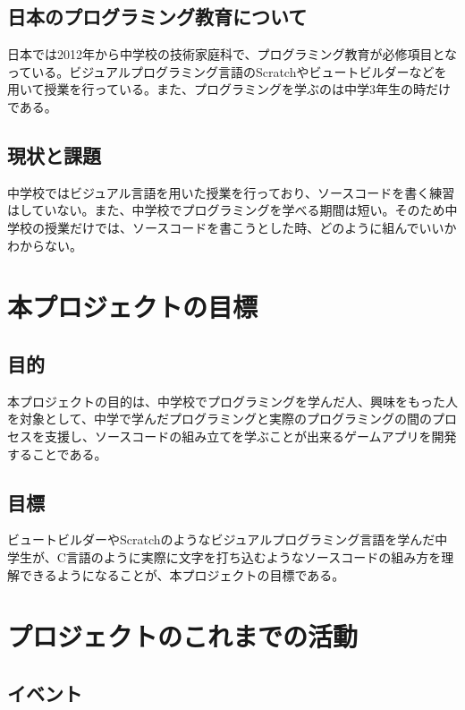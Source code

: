 \documentclass[openany,11pt,papersize]{jsbook}
\begin{document}
\section{日本のプログラミング教育について}
日本では2012年から中学校の技術家庭科で、プログラミング教育が必修項目となっている。ビジュアルプログラミング言語のScratchやビュートビルダーなどを用いて授業を行っている。また、プログラミングを学ぶのは中学3年生の時だけである。


\section{現状と課題}
中学校ではビジュアル言語を用いた授業を行っており、ソースコードを書く練習はしていない。また、中学校でプログラミングを学べる期間は短い。そのため中学校の授業だけでは、ソースコードを書こうとした時、どのように組んでいいかわからない。

\chapter{本プロジェクトの目標}

\section{目的}\label{sec:mokuteki}
本プロジェクトの目的は、中学校でプログラミングを学んだ人、興味をもった人を対象として、中学で学んだプログラミングと実際のプログラミングの間のプロセスを支援し、ソースコードの組み立てを学ぶことが出来るゲームアプリを開発することである。


\section{目標}
ビュートビルダーやScratchのようなビジュアルプログラミング言語を学んだ中学生が、C言語のように実際に文字を打ち込むようなソースコードの組み方を理解できるようになることが、本プロジェクトの目標である。

\chapter{プロジェクトのこれまでの活動}

\section{イベント}
\end{document}
